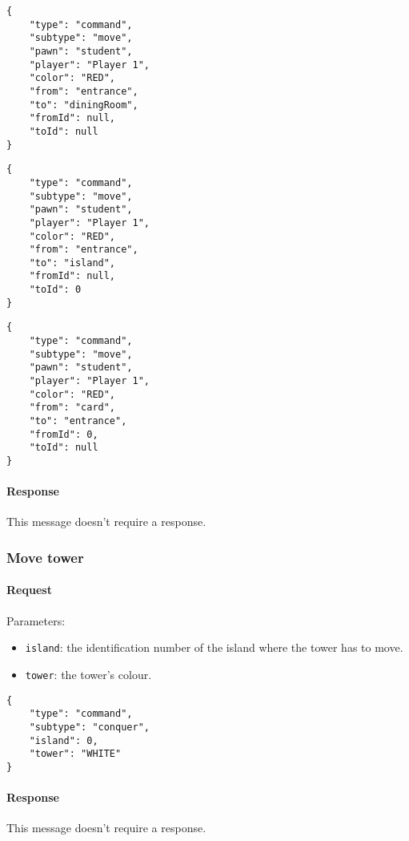 \documentclass[a4paper]{article}
\begin{document}
	\begin{multicols}{3}
		\begin{verbatim}
{
	"type": "command",
	"subtype": "move",
	"pawn": "student",
	"player": "Player 1",
	"color": "RED",
	"from": "entrance",
	"to": "diningRoom",
	"fromId": null,
	"toId": null
}
		\end{verbatim}

		\begin{verbatim}
{
	"type": "command",
	"subtype": "move",
	"pawn": "student",
	"player": "Player 1",
	"color": "RED",
	"from": "entrance",
	"to": "island",
	"fromId": null,
	"toId": 0
}
		\end{verbatim}

		\begin{verbatim}
{
	"type": "command",
	"subtype": "move",
	"pawn": "student",
	"player": "Player 1",
	"color": "RED",
	"from": "card",
	"to": "entrance",
	"fromId": 0,
	"toId": null
}
		\end{verbatim}
	\end{multicols}

	\paragraph{Response} This message doesn't require a response.

	\subsubsection{Move tower}

	\paragraph{Request} Parameters:

	\begin{itemize}
		\item \verb|island|: the identification number of the island where the tower has to move.
		\item \verb|tower|: the tower's colour.
	\end{itemize}

	\begin{verbatim}
{
	"type": "command",
	"subtype": "conquer",
	"island": 0,
	"tower": "WHITE"
}
	\end{verbatim}

	\paragraph{Response} This message doesn't require a response.
\end{document}
